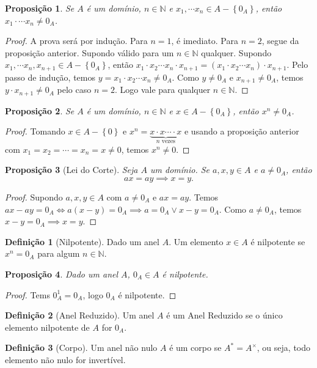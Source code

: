 \documentclass{article}
\theoremstyle{plain}
\newtheorem{prop}{Proposição}[section]
\theoremstyle{definition}
\newtheorem{definicao}{Definição}[section]
\theoremstyle{remark}
\begin{document}
\begin{prop}
	Se $A$ é um domínio, $n\in \mathbb{N}$ e $x_1,\cdots x_n\in A- \left\{0_A\right\}$, então $x_1\cdot \cdots x_n \neq 0_A$.
\end{prop}
\begin{proof}
	A prova será por indução. Para $n=1$, é imediato. Para $n = 2$, segue da proposição anterior. Supondo válido para um $n\in \mathbb{N}$ qualquer.
	Supondo $x_1,\cdots x_n, x_{n+1} \in A - \left\{0_A \right\}$, então $x_1\cdot x_2\cdots x_n \cdot x_{n+1} = (x_1\cdot x_2\cdots x_n) \cdot x_{n+1} $. Pelo passo de indução, temos $ y = x_1\cdot x_2\cdots x_n \neq 0_A$. Como $y\neq 0_A$ e $x_{n+1}\neq 0_A$, temos $y\cdot x_{n+1} \neq 0_A$ pelo caso $n=2$. Logo vale para qualquer $n\in \mathbb{N}$.
\end{proof}
\begin{prop}
	\label{propNilpotente}
	Se $A$ é um domínio, $n\in \mathbb{N}$ e $x\in A- \left\{0_A\right\}$, então $x^n \neq 0_A$.
\end{prop}
\begin{proof}
	Tomando $x\in A - \left\{0 \right\}$ e  $x^n = \underbrace{x\cdot x\cdots \cdot x}_{n \text{ vezes}}$ e usando a proposição anterior com $x_1 = x_2 = \cdots = x_n = x \neq 0 $, temos $x^n \neq 0$.
\end{proof}
\begin{prop}[Lei do Corte]
	Seja $A$ um domínio. Se $a,x,y \in A$ e $a\neq 0_A$, então $$ ax = ay \implies x = y.$$
\end{prop}
\begin{proof}
	Supondo $a,x,y\in A$ com $a\neq 0_A$ e $ax=ay$. Temos $ax -ay = 0_A  \iff a(x-y) = 0_A \implies a = 0_A \lor x-y = 0_A$.  Como $a\neq 0_A$, temos $x-y = 0_A \implies x = y$.
\end{proof}
\begin{definicao}[Nilpotente]
	Dado um anel $A$. Um elemento $x\in A$ é nilpotente se $x^n = 0_A$ para algum $n\in \mathbb{N}$.
\end{definicao}
\begin{prop}
	Dado um anel $A$, $0_A \in A$ é nilpotente.
\end{prop}
\begin{proof}
	Tems $0_A^1 = 0_A $, logo $0_A$ é nilpotente.
\end{proof}
\begin{definicao}[Anel Reduzido]
	Um anel $A$ é um Anel Reduzido  se o único elemento nilpotente de $A$ for $0_A$.
\end{definicao}
\begin{definicao}[Corpo]
	Um anel não nulo $A$ é um corpo se $A^{*} = A^{\times}$, ou seja, todo elemento não nulo for invertível.
\end{definicao}
\end{document}
